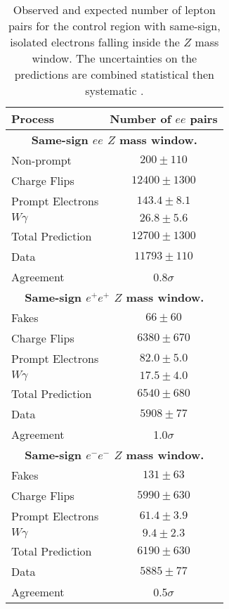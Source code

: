 \begin{table}[htbp]
\caption{Observed and expected number of lepton pairs for the control region with same-sign, isolated electrons falling inside the $Z$ mass window. 
The uncertainties on the predictions are combined statistical then systematic .}
\begin{center}
\begin{tabular}{l|c}
\hline
Process & Number of $ee$ pairs \\\hline\hline
%
\multicolumn{2}{c}{\textbf{Same-sign $ee$ $Z$ mass window.}} \\\hline 
        Non-prompt      & $200 \pm 110$ \\[+0.05in]
        Charge Flips & $12400 \pm 1300$ \\[+0.05in]
        Prompt Electrons & $143.4 \pm 8.1$ \\[+0.05in]
        $W\gamma$  & $26.8 \pm 5.6$ \\[+0.05in]
            \hline
        Total Prediction & $12700 \pm 1300$ \\[+0.05in]
            \hline
        Data       &       $11793 \pm 110$ \\[+0.05in]
            \hline
        Agreement  &      0.8$\sigma$ \\[+0.05in]
\hline \hline
\multicolumn{2}{c}{\textbf{Same-sign $e^{+}e^{+}$ $Z$ mass window.}} \\\hline 
        Fakes      & $66 \pm 60$ \\[+0.05in]
        Charge Flips & $6380 \pm 670$ \\[+0.05in]
        Prompt Electrons & $82.0 \pm 5.0$ \\[+0.05in]
        $W\gamma$  & $17.5 \pm 4.0$ \\[+0.05in]
            \hline
        Total Prediction & $6540 \pm 680$ \\[+0.05in]
            \hline
        Data       &        $5908 \pm 77$ \\[+0.05in]
            \hline
        Agreement  &     1.0$\sigma$ \\[+0.05in]
%
\hline \hline
\multicolumn{2}{c}{\textbf{Same-sign $e^{-}e^{-}$ $Z$ mass window.}} \\\hline 
        Fakes      & $131 \pm 63$ \\[+0.05in]
        Charge Flips & $5990 \pm 630$ \\[+0.05in]
        Prompt Electrons & $61.4 \pm 3.9$ \\[+0.05in]
        $W\gamma$  & $9.4 \pm 2.3$ \\[+0.05in]
            \hline
        Total Prediction & $6190 \pm 630$ \\[+0.05in]
            \hline
        Data       &        $5885 \pm 77$ \\[+0.05in]
            \hline
        Agreement  &     0.5$\sigma$ \\[+0.05in]
\hline 
\end{tabular}
\end{center}
\label{tab:ee_isoSS_Z}
\end{table}


